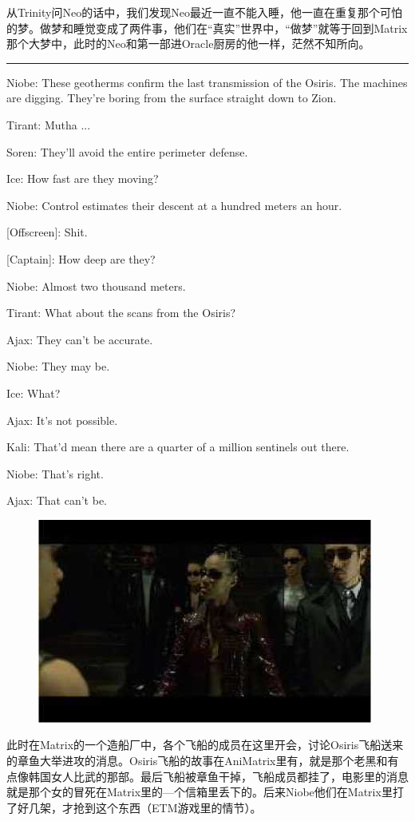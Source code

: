 \documentclass[UTF8]{ctexart}
\newcommand{\myparsep}{\noindent \rule[0.5ex]{\linewidth}{1pt}}
\newenvironment{myquote}{\color{green} \setlength{\leftskip}{6em} \setlength{\rightskip}{4em} \setlength{\parindent}{-2em}}{\par}
\begin{document}
从Trinity问Neo的话中，我们发现Neo最近一直不能入睡，他一直在重复那个可怕的梦。做梦和睡觉变成了两件事，他们在“真实”世界中，“做梦”就等于回到Matrix那个大梦中，此时的Neo和第一部进Oracle厨房的他一样，茫然不知所向。

\myparsep

\begin{myquote}
Niobe: These geotherms confirm the last transmission of the Osiris. The machines are digging. They're boring from the surface straight down to Zion.

Tirant: Mutha ...

Soren: They'll avoid the entire perimeter defense.

Ice: How fast are they moving?

Niobe: Control estimates their descent at a hundred meters an hour.

[Offscreen]: Shit.

[Captain]: How deep are they?

Niobe: Almost two thousand meters.

Tirant: What about the scans from the Osiris?

Ajax: They can't be accurate.

Niobe: They may be.

Ice: What?

Ajax: It's not possible.

Kali: That'd mean there are a quarter of a million sentinels out there.

Niobe: That's right.

Ajax: That can't be.
\end{myquote}

\begin{figure}[htb]
\centering
\includegraphics[width=0.5\linewidth]{fig/read_reloaded-15}
\end{figure}

此时在Matrix的一个造船厂中，各个飞船的成员在这里开会，讨论Osiris飞船送来的章鱼大举进攻的消息。Osiris飞船的故事在AniMatrix里有，就是那个老黑和有点像韩国女人比武的那部。最后飞船被章鱼干掉，飞船成员都挂了，电影里的消息就是那个女的冒死在Matrix里的—个信箱里丢下的。后来Niobe他们在Matrix里打了好几架，才抢到这个东西（ETM游戏里的情节）。
\end{document}
